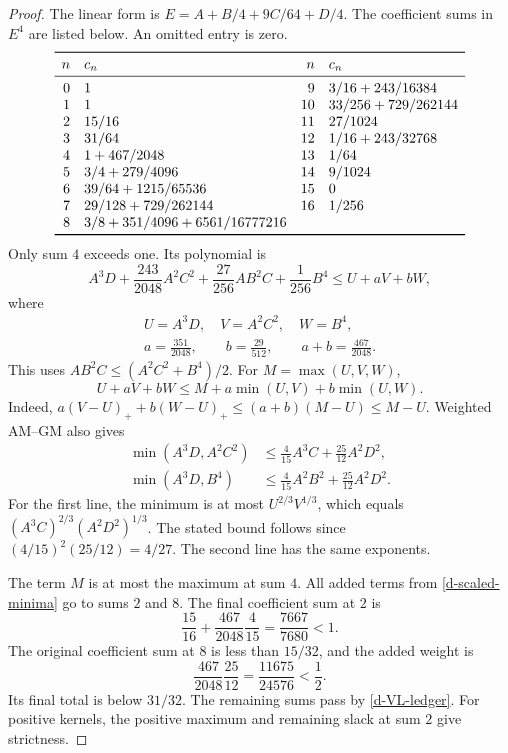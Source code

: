 \begin{proof}
The linear form is $E=A+B/4+9C/64+D/4$. The coefficient sums in $E^4$
are listed below. An omitted entry is zero.
\begin{equation}\label{d-VL-ledger}
\begin{array}{r l r l}
\toprule
n&c_n&n&c_n\\
\midrule
0&1&9&3/16+243/16384\\
1&1&10&33/256+729/262144\\
2&15/16&11&27/1024\\
3&31/64&12&1/16+243/32768\\
4&1+467/2048&13&1/64\\
5&3/4+279/4096&14&9/1024\\
6&39/64+1215/65536&15&0\\
7&29/128+729/262144&16&1/256\\
8&3/8+351/4096+6561/16777216&&\\
\bottomrule
\end{array}
\end{equation}
Only sum $4$ exceeds one. Its polynomial is
\[
A^3D+\frac{243}{2048}A^2C^2+\frac{27}{256}AB^2C+\frac1{256}B^4
\leq U+aV+bW,
\]
where
\begin{equation}\label{d-VL-collision}
\begin{gathered}
U=A^3D,\quad V=A^2C^2,\quad W=B^4,\\
a=\frac{351}{2048},\qquad b=\frac{29}{512},\qquad
a+b=\frac{467}{2048}.
\end{gathered}
\end{equation}
This uses $AB^2C\leq(A^2C^2+B^4)/2$. For $M=\max(U,V,W)$,
\begin{equation}\label{d-minimum-split}
U+aV+bW\leq M+a\min(U,V)+b\min(U,W).
\end{equation}
Indeed,
$a(V-U)_++b(W-U)_+\leq(a+b)(M-U)\leq M-U$.
Weighted AM--GM also gives
\begin{equation}\label{d-scaled-minima}
\begin{aligned}
\min(A^3D,A^2C^2)&\leq\tfrac4{15}A^3C+\tfrac{25}{12}A^2D^2,\\
\min(A^3D,B^4)&\leq\tfrac4{15}A^2B^2+\tfrac{25}{12}A^2D^2.
\end{aligned}
\end{equation}
For the first line, the minimum is at most $U^{2/3}V^{1/3}$, which equals
$(A^3C)^{2/3}(A^2D^2)^{1/3}$. The stated bound follows since
$(4/15)^2(25/12)=4/27$. The second line has the same exponents.

The term $M$ is at most the maximum at sum $4$. All added terms from
\eqref{d-scaled-minima} go to sums $2$ and $8$. The final coefficient
sum at $2$ is
\begin{equation}\label{d-VL-two}
\frac{15}{16}+\frac{467}{2048}\frac4{15}
=\frac{7667}{7680}<1.
\end{equation}
The original coefficient sum at $8$ is less than $15/32$, and the added
weight is
\[
\frac{467}{2048}\frac{25}{12}=\frac{11675}{24576}<\frac12.
\]
Its final total is below $31/32$. The remaining sums pass by
\eqref{d-VL-ledger}. For positive kernels, the positive maximum and
remaining slack at sum $2$ give strictness.
\end{proof}

